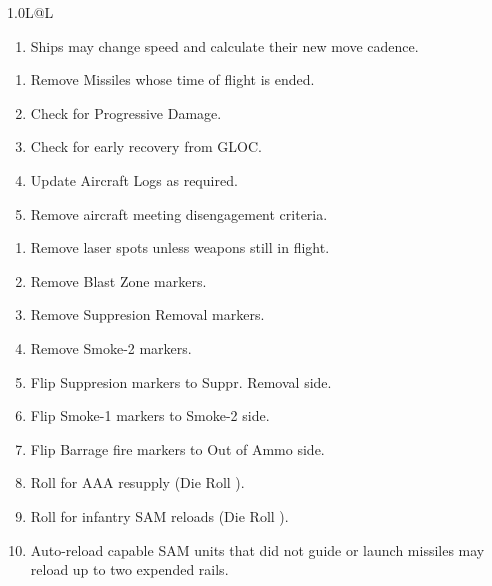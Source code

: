 \begin{twocolumntablefloat}
\begin{twocolumntable}
\begin{tabularx}{1.0\linewidth}{L@{\hspace{\columnsep}}L}
{\begin{enumerate}[nosep]
\item Ships may change speed and calculate their new move cadence.
\end{enumerate}
}


\begin{enumerate}[nosep]
    \item Remove Missiles whose time of flight is ended.
    \item Check for Progressive Damage.
    \item Check for early recovery from GLOC.
    \item Update Aircraft Logs as required.
    \item Remove aircraft meeting disengagement criteria.
\end{enumerate}


\begin{enumerate}[nosep]
    \item Remove laser spots unless weapons still in flight.
    \item Remove Blast Zone markers.
    \item Remove Suppresion Removal markers.
    \item Remove Smoke-2 markers.
    \item Flip Suppresion markers to Suppr. Removal side.
    \item Flip Smoke-1 markers to Smoke-2 side.
    \item Flip Barrage fire markers to Out of Ammo side.
    \item Roll for AAA resupply (Die Roll ).
    \item Roll for infantry SAM reloads (Die Roll ).
    \item Auto-reload capable SAM units that did not guide or launch missiles may reload up to two expended rails.
\end{enumerate}

\\
\bottomrule
\end{tabularx}

\end{twocolumntable}
\end{twocolumntablefloat}

